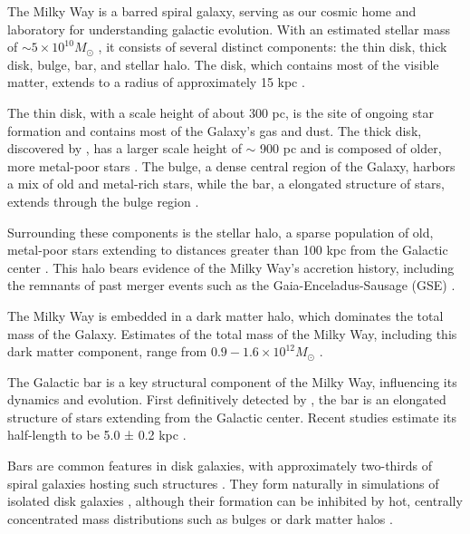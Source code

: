 The Milky Way is a barred spiral galaxy, serving as our cosmic home and laboratory for understanding galactic evolution. With an estimated stellar mass of $\sim 5 \times 10^{10} M_{\odot}$ \citep{2015ApJ...806...96L}, it consists of several distinct components: the thin disk, thick disk, bulge, bar, and stellar halo. The disk, which contains most of the visible matter, extends to a radius of approximately 15 kpc \citep{2016ARA&A..54..529B}. 

The thin disk, with a scale height of about 300 pc, is the site of ongoing star formation and contains most of the Galaxy's gas and dust. The thick disk, discovered by \citet{1983MNRAS.202.1025G}, has a larger scale height of $\sim$ 900 pc and is composed of older, more metal-poor stars \citep{2008ApJ...673..864J}. The bulge, a dense central region of the Galaxy, harbors a mix of old and metal-rich stars, while the bar, a elongated structure of stars, extends through the bulge region \citep{2016ARA&A..54..529B}.

Surrounding these components is the stellar halo, a sparse population of old, metal-poor stars extending to distances greater than 100 kpc from the Galactic center \citep{2020ARA&A..58..205H}. This halo bears evidence of the Milky Way's accretion history, including the remnants of past merger events such as the Gaia-Enceladus-Sausage (GSE) \citep{2018Natur.563...85H, 2018MNRAS.478..611B}.

The Milky Way is embedded in a dark matter halo, which dominates the total mass of the Galaxy. Estimates of the total mass of the Milky Way, including this dark matter component, range from $0.9 - 1.6 \times 10^{12} M_{\odot}$ \citep{2019ApJ...873..118W}.


The Galactic bar is a key structural component of the Milky Way, influencing its dynamics and evolution. First definitively detected by \citet{1991ApJ...379..631B}, the bar is an elongated structure of stars extending from the Galactic center. Recent studies estimate its half-length to be 5.0 ± 0.2 kpc \citep{2019MNRAS.490.4740B}.

Bars are common features in disk galaxies, with approximately two-thirds of spiral galaxies hosting such structures \citep{2000AJ....119..536E, 2007ApJ...657..790M}. They form naturally in simulations of isolated disk galaxies \citep{1971ApJ...168..343H}, although their formation can be inhibited by hot, centrally concentrated mass distributions such as bulges or dark matter halos \citep{1973ApJ...186..467O, 1976AJ.....81...30H}.

